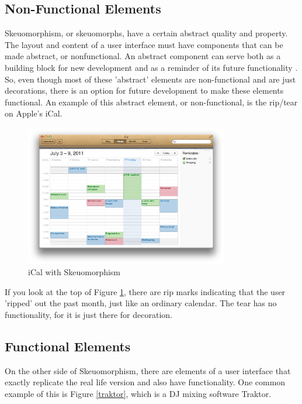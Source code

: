 \documentclass{article}
\begin{document}
\subsection{Non-Functional Elements}

Skeuomorphism, or skeuomorphs, have a certain abstract quality and property.  The layout and content of a user interface must have components that can be made abstract, or nonfunctional.  An abstract component can serve both as a building block for new development and as a reminder of its future functionality \cite{skeu-software}. So, even though most of these 'abstract' elements are non-functional and are just decorations, there is an option for future development to make these elements functional.  An example of this abstract element, or non-functional, is the rip/tear on Apple's iCal.

\begin{figure}[H]
\centering
\includegraphics[width=3.5in]{ical.jpeg} 

\caption{iCal with Skeuomorphism}
\label{iCal}
\end{figure}

If you look at the top of Figure \ref{iCal}, there are rip marks indicating that the user 'ripped' out the past month, just like an ordinary calendar.  The tear has no functionality, for it is just there for decoration.

\subsection{Functional Elements}

On the other side of Skeuomorphism, there are elements of a user interface that exactly replicate the real life version and also have functionality.  One common example of this is Figure \ref{traktor}, which is a DJ mixing software Traktor.
\end{document}
